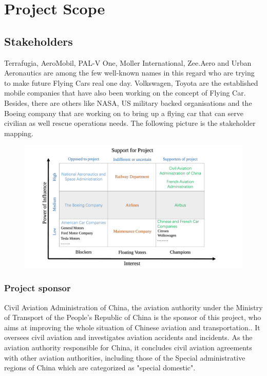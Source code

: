 \chapter{Project Scope}

\section{Stakeholders}

Terrafugia, AeroMobil, PAL-V One, Moller International, Zee.Aero and Urban Aeronautics are among the few well-known names in this regard who are trying to make future Flying Cars real one day. Volkswagen, Toyota are the established mobile companies that have also been working on the concept of Flying Car. Besides, there are others like NASA, US military backed organisations and the Boeing company that are working on to bring up a flying car that can serve civilian as well rescue operations needs. The following picture is the stakeholder mapping.

\begin{figure}[H]
\centering
\includegraphics[width=14cm]{pic/stakeholders.pdf}
\end{figure}

\subsection{Project sponsor}

Civil Aviation Administration of China, the aviation authority under the Ministry of Transport of the People's Republic of China is the sponsor of this project, who aims at improving the whole situation of Chinese aviation and transportation.. It oversees civil aviation and investigates aviation accidents and incidents. As the aviation authority responsible for China, it concludes civil aviation agreements with other aviation authorities, including those of the Special administrative regions of China which are categorized as "special domestic".


